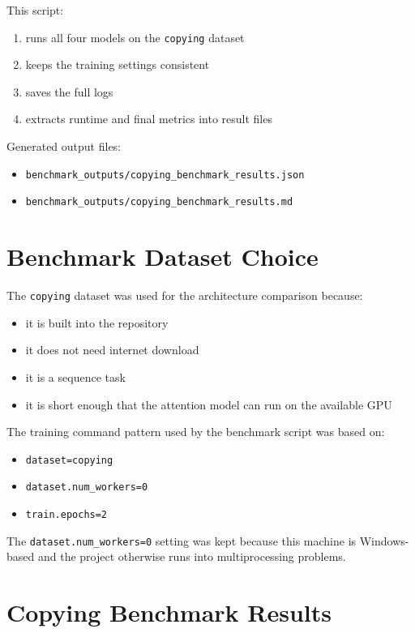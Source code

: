\documentclass[12pt]{article}
\begin{document}
This script:

\begin{enumerate}
    \item runs all four models on the \texttt{copying} dataset
    \item keeps the training settings consistent
    \item saves the full logs
    \item extracts runtime and final metrics into result files
\end{enumerate}

Generated output files:

\begin{itemize}
    \item \texttt{benchmark\_outputs/copying\_benchmark\_results.json}
    \item \texttt{benchmark\_outputs/copying\_benchmark\_results.md}
\end{itemize}

\section*{Benchmark Dataset Choice}

The \texttt{copying} dataset was used for the architecture comparison because:

\begin{itemize}
    \item it is built into the repository
    \item it does not need internet download
    \item it is a sequence task
    \item it is short enough that the attention model can run on the available GPU
\end{itemize}

The training command pattern used by the benchmark script was based on:

\begin{itemize}
    \item \texttt{dataset=copying}
    \item \texttt{dataset.num\_workers=0}
    \item \texttt{train.epochs=2}
\end{itemize}

The \texttt{dataset.num\_workers=0} setting was kept because this machine is Windows-based and the project otherwise runs into multiprocessing problems.

\section*{Copying Benchmark Results}
\end{document}
